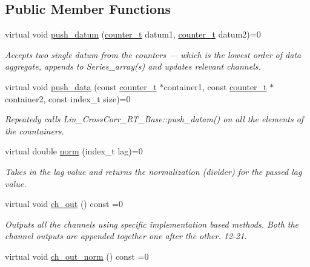 \subsection*{Public Member Functions}
\begin{DoxyCompactItemize}
\item 
virtual void \hyperlink{classLin__CrossCorr__RT__Base_abdc90b5ab6a5f7ac98e97b3d16261834}{push\+\_\+datum} (\hyperlink{types_8hpp_ac89ac912f524b3e3fa3720ea55fec966}{counter\+\_\+t} datum1, \hyperlink{types_8hpp_ac89ac912f524b3e3fa3720ea55fec966}{counter\+\_\+t} datum2)=0
\begin{DoxyCompactList}\small\item\em Accepts two single {\ttfamily datum} from the counters — which is the lowest order of data aggregate, appends to Series\+\_\+array(s) and updates relevant channels. \end{DoxyCompactList}\item 
virtual void \hyperlink{classLin__CrossCorr__RT__Base_a48faa93c6766605436fd8399949beb11}{push\+\_\+data} (const \hyperlink{types_8hpp_ac89ac912f524b3e3fa3720ea55fec966}{counter\+\_\+t} $\ast$container1, const \hyperlink{types_8hpp_ac89ac912f524b3e3fa3720ea55fec966}{counter\+\_\+t} $\ast$container2, const index\+\_\+t size)=0
\begin{DoxyCompactList}\small\item\em Repeatedy calls {\ttfamily Lin\+\_\+\+Cross\+Corr\+\_\+\+R\+T\+\_\+\+Base\+::push\+\_\+datam()} on all the elements of the countainers. \end{DoxyCompactList}\item 
virtual double \hyperlink{classLin__CrossCorr__RT__Base_a43779bc7fd546fa8f73713de4bd6e285}{norm} (index\+\_\+t lag)=0
\begin{DoxyCompactList}\small\item\em Takes in the lag value and returns the normalization (divider) for the passed lag value. \end{DoxyCompactList}\item 
virtual void \hyperlink{group__Lin__CorrCorr__Base__Out_ga5d7bad992e07606a18ea828aeb768e1f}{ch\+\_\+out} () const =0
\begin{DoxyCompactList}\small\item\em Outputs all the channels using specific implementation based methods. Both the channel outputs are appended together one after the other. 12-\/21. \end{DoxyCompactList}\item 
virtual void \hyperlink{group__Lin__CorrCorr__Base__Out_gaaac0e6901df27096d687c228638c012b}{ch\+\_\+out\+\_\+norm} () const =0

\end{DoxyCompactItemize}
